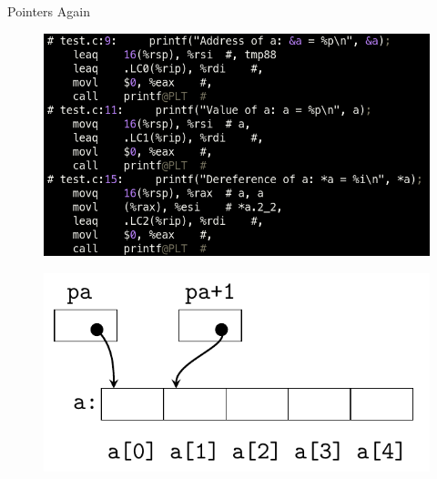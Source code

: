 \documentclass[10pt]{beamer}
\begin{document}
\begin{frame}{Pointers Again}
 \framebreak
 
    \begin{figure}
        \includegraphics[keepaspectratio, width=\textwidth, height=\textheight-2\baselineskip-2\baselineskip]{img/ptr_asm.png} \\
    \end{figure}
    \framebreak
 
    \begin{figure}
        \includegraphics[keepaspectratio, width=\textwidth, height=\textheight-2\baselineskip-2\baselineskip]{img/array_ptr.png} \\
    \end{figure}
    \framebreak
    

\end{frame}
\end{document}

